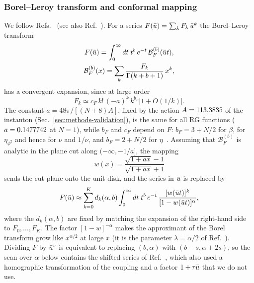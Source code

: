 \subsubsection{Borel--Leroy transform and conformal mapping}
\label{sec:resummation-method}

We follow Refs.~\cite{LeGuillouZinnJustin1977,LeGuillouZinnJustin1980,GuidaZinnJustin1998} (see also
Ref.~\cite{ZinnJustinBook}). For a series $F(\bar u)=\sum_k F_k\,\bar u^k$ the Borel--Leroy transform
\begin{gather}
F(\bar u)=\int_0^\infty dt\;t^{b}\,e^{-t}\,\mathcal B_F^{(b)}(\bar u t),\nonumber\\
\mathcal B_F^{(b)}(x)=\sum_k\frac{F_k}{\Gamma(k+b+1)}\,x^k,
\label{eq:borel}
\end{gather}
has a convergent expansion, since at large order~\cite{Lipatov1977,BrezinLeGuillouZinnJustin1977,BrezinParisi1978,ZinnJustinBook}
\begin{equation}
F_k\simeq c_F\,k!\,(-a)^k\,k^{b_F}\bigl[1+O(1/k)\bigr].
\label{eq:largeorder}
\end{equation}
The constant $a=48\pi/[(N+8)A]$, fixed by the action $A=113.3835$ of the instanton
(Sec.~\ref{sec:methods-validation}), is the same for all RG functions ($a=0.1477742$ at $N=1$), while $b_F$ and $c_F$
depend on $F$: $b_F=3+N/2$ for $\beta$, for $\eta_{\phi^2}$ and hence for $\nu$ and $1/\nu$, and $b_F=2+N/2$ for
$\eta$~\cite{ZinnJustinBook,Ribeca2003thesis}. Assuming that $\mathcal B_F^{(b)}$ is analytic in the plane cut along
$(-\infty,-1/a]$, the mapping
\begin{equation}
w(x)=\frac{\sqrt{1+a x}-1}{\sqrt{1+a x}+1}
\label{eq:conformal}
\end{equation}
sends the cut plane onto the unit disk, and the series in $\bar u$ is replaced by
\begin{equation}
F(\bar u)\approx\sum_{k=0}^{K}d_k(\alpha,b)\int_0^\infty dt\;t^{b}\,e^{-t}\,
\frac{[w(\bar u t)]^k}{[1-w(\bar u t)]^{\alpha}},
\label{eq:resummed}
\end{equation}
where the $d_k(\alpha,b)$ are fixed by matching the expansion of the right-hand side to $F_0,\dots,F_K$. The factor
$[1-w]^{-\alpha}$ makes the approximant of the Borel transform grow like $x^{\alpha/2}$ at large $x$ (it is the
parameter $\lambda=\alpha/2$ of Ref.~\cite{KompanietsPanzer2017}). Dividing $F$ by $\bar u^s$ is equivalent to replacing
$(b,\alpha)$ with $(b-s,\alpha+2s)$, so the scan over $\alpha$ below contains the shifted series of
Ref.~\cite{GuidaZinnJustin1998}, which also used a homographic transformation of the coupling and a factor
$1+r\bar u$ that we do not use.

